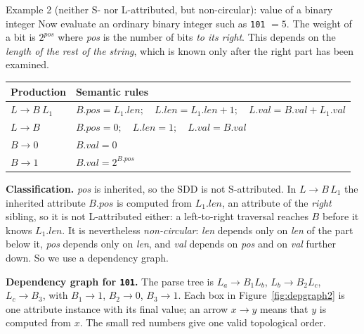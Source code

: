 \documentclass[11pt,a4paper]{article}
\newcommand{\at}[2]{\ensuremath{#1.\mathit{#2}}}
\begin{document}
\begin{examplebox}{Example 2 (neither S- nor L-attributed, but non-circular): value of a binary integer}
Now evaluate an ordinary binary integer such as \texttt{101} $=5$. The weight of a bit is $2^{\textit{pos}}$ where \textit{pos} is the number of bits \emph{to its right}. This depends on the \emph{length of the rest of the string}, which is known only after the right part has been examined.
\begin{center}
\small
\begin{tabular}{@{}l l@{}}
\toprule
\textbf{Production} & \textbf{Semantic rules} \\ \midrule
$L \to B\ L_1$ & $\at{B}{pos}=\at{L_1}{len};\quad \at{L}{len}=\at{L_1}{len}+1;\quad \at{L}{val}=\at{B}{val}+\at{L_1}{val}$ \\
$L \to B$ & $\at{B}{pos}=0;\quad \at{L}{len}=1;\quad \at{L}{val}=\at{B}{val}$ \\
$B \to 0$ & $\at{B}{val}=0$ \\
$B \to 1$ & $\at{B}{val}=2^{\at{B}{pos}}$ \\ \bottomrule
\end{tabular}
\end{center}
\textbf{Classification.} \textit{pos} is inherited, so the SDD is not S-attributed. In $L\to B\,L_1$ the inherited attribute $\at{B}{pos}$ is computed from $\at{L_1}{len}$, an attribute of the \emph{right} sibling, so it is not L-attributed either: a left-to-right traversal reaches $B$ before it knows $\at{L_1}{len}$. It is nevertheless \emph{non-circular}: \textit{len} depends only on \textit{len} of the part below it, \textit{pos} depends only on \textit{len}, and \textit{val} depends on \textit{pos} and on \textit{val} further down. So we use a dependency graph.

\textbf{Dependency graph for \texttt{101}.} The parse tree is $L_a\to B_1L_b$, $L_b\to B_2L_c$, $L_c\to B_3$, with $B_1\to1$, $B_2\to0$, $B_3\to1$. Each box in Figure~\ref{fig:depgraph2} is one attribute instance with its final value; an arrow $x\to y$ means that $y$ is computed from $x$. The small red numbers give one valid topological order.


\end{examplebox}
\end{document}
